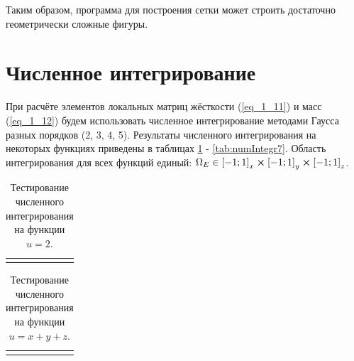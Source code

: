 Таким образом, программа для построения сетки может строить достаточно геометрически сложные фигуры.

\section{Численное интегрирование}

При расчёте элементов локальных матриц жёсткости (\ref{eq_1_11}) и масс (\ref{eq_1_12}) будем использовать численное интегрирование методами Гаусса разных порядков (2, 3, 4, 5). Результаты численного интегрирования на некоторых функциях приведены в таблицах \ref{tab:numIntegr1} - \ref{tab:numIntegr7}. Область интегрирования для всех функций единый: $\Omega_E \in \left[-1; 1\right]_x \cross \left[-1; 1\right]_y \cross \left[-1; 1\right]_z$.

\begin{table}
	\caption{Тестирование численного интегрирования на функции $u = 2$.}
	\centering
	\small
	\begin{tabularx}{1.0\textwidth}{| >{\raggedright\arraybackslash}X | >{\raggedright\arraybackslash}X | >{\raggedright\arraybackslash}X |>{\raggedright\arraybackslash}X |>{\raggedright\arraybackslash}X |}
		\hline
		\centering{Аналитический результат} & \centering{Гаусс 2} & \centering{Гаусс 3} & \centering{Гаусс 4} & \centering{Гаусс 5} \tabularnewline \hline
		
		\centering{16.0} & \centering{1.6000000e+01}& \centering{1.6000000e+01} & \centering{1.6000000e+01} & \centering{1.6000000e+01} \tabularnewline \hline
		
	\end{tabularx}
	\label{tab:numIntegr1}
\end{table}


\begin{table}
	\caption{Тестирование численного интегрирования на функции $u = x + y + z$.}
	\centering
	\small
	\begin{tabularx}{1.0\textwidth}{| >{\raggedright\arraybackslash}X | >{\raggedright\arraybackslash}X | >{\raggedright\arraybackslash}X |>{\raggedright\arraybackslash}X |>{\raggedright\arraybackslash}X |}
		\hline
		\centering{Аналитический результат} & \centering{Гаусс 2} & \centering{Гаусс 3} & \centering{Гаусс 4} & \centering{Гаусс 5} \tabularnewline \hline
		
		\centering{0.0} & \centering{0.0000000e+00}& \centering{-2.2204460e-16} & \centering{5.6898930e-16} & \centering{-6.5225603e-16} \tabularnewline \hline
		
	\end{tabularx}
	\label{tab:numIntegr2}
\end{table}

